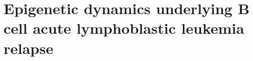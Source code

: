 \chapter{Epigenetic dynamics underlying B cell acute lymphoblastic leukemia relapse}
\label{chap:BALL}
